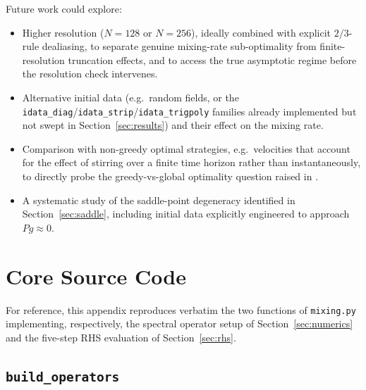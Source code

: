 \documentclass[12pt,a4paper]{article}
\newcommand{\Proj}{P}
\theoremstyle{definition}
\theoremstyle{plain}
\begin{document}
Future work could explore:
\begin{itemize}
  \item Higher resolution ($N=128$ or $N=256$), ideally combined with
        explicit $2/3$-rule dealiasing, to separate genuine mixing-rate
        sub-optimality from finite-resolution truncation effects, and to
        access the true asymptotic regime before the resolution check
        intervenes.
  \item Alternative initial data (e.g.\ random fields, or the
        \texttt{idata\_diag}/\texttt{idata\_strip}/\texttt{idata\_trigpoly}
        families already implemented but not swept in
        Section~\ref{sec:results}) and their effect on the mixing rate.
  \item Comparison with non-greedy optimal strategies, e.g.\ velocities
        that account for the effect of stirring over a finite time horizon
        rather than instantaneously, to directly probe the greedy-vs-global
        optimality question raised in \cite{Iyer2014,Drivas2022}.
  \item A systematic study of the saddle-point degeneracy identified in
        Section~\ref{sec:saddle}, including initial data explicitly
        engineered to approach $\Proj g \approx 0$.
\end{itemize}

\appendix
\section{Core Source Code}
\label{app:code}

For reference, this appendix reproduces verbatim the two functions of
\texttt{mixing.py} implementing, respectively, the spectral operator setup
of Section~\ref{sec:numerics} and the five-step RHS evaluation of
Section~\ref{sec:rhs}.

\subsection{\texttt{build\_operators}}
\end{document}
